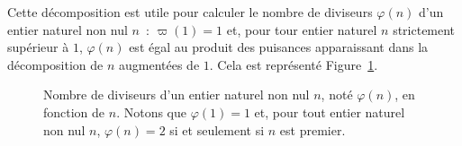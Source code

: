 \begin{multicols}{4}

\end{multicols}

\noindent
Cette décomposition est utile pour calculer le nombre de diviseurs $\varphi(n)$ d'un entier naturel non nul $n$ : $\varpi(1) = 1$ et, pour tour entier naturel $n$ strictement supérieur à $1$, $\varphi(n)$ est égal au produit des puisances apparaissant dans la décomposition de $n$ augmentées de $1$. 
Cela est représenté Figure~\ref{fig:varphi_n}.


\begin{figure} 
    \centering
    \caption{Nombre de diviseurs d'un entier naturel non nul $n$, noté $\varphi(n)$, en fonction de $n$. 
             Notons que $\varphi(1) = 1$ et, pour tout entier naturel non nul $n$, $\varphi(n) = 2$ si et seulement si $n$ est premier.}
    \label{fig:varphi_n}
\end{figure}

\clearpage

\makeatletter
\renewenvironment{theindex}
  {\if@twocolumn
      \@restonecolfalse
   \else
      \@restonecoltrue
   \fi
   \setlength{\columnseprule}{0pt}
   \setlength{\columnsep}{35pt}
   \begin{multicols}{3}[\section*{\indexname}]
   \addcontentsline{toc}{section}{\indexname}
   \markboth{\MakeUppercase\indexname}%
            {\MakeUppercase\indexname}%
   \thispagestyle{plain}
   \setlength{\parindent}{0pt}
   \setlength{\parskip}{0pt plus 0.3pt}
   \relax
   \let\item\@idxitem}%
  {\end{multicols}\if@restonecol\onecolumn\else\clearpage\fi}
\makeatother

\printindex*

\bye
